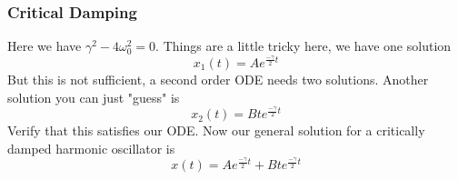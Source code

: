 \documentclass{report}
\numberwithin{equation}{section}
\begin{document}
\subsubsection{Critical Damping}
Here we have $\gamma^2 -4\omega_0^2 = 0$. Things are a little tricky here, we have one solution
\begin{equation}
	x_1(t) = Ae^{\frac{-\gamma}{2}t}
\end{equation}
But this is not sufficient, a second order ODE needs two solutions. Another solution you can just "guess" is
\begin{equation}
	x_2(t) = Bte^{\frac{-\gamma}{2}t}
\end{equation}
Verify that this satisfies our ODE. Now our general solution for a critically damped harmonic oscillator is
\begin{equation}
	x(t) =  Ae^{\frac{-\gamma}{2}t} + Bte^{\frac{-\gamma}{2}t}
\end{equation}
\end{document}
